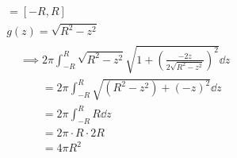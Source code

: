 \begin{bsp*}[note = Oberfläche einer Kugel mit Radius $R$]
	\begin{gather*}
		[a,b] = [-R,R] \\
		g(z) = \sqrt{R^2 - z^2} \\
		\begin{split}
			&\implies 2\pi \int_{-R}^R \sqrt{R^2 - z^2} \sqrt{1 + \left( \frac{-2z}{2\sqrt{R^2 -z^2}} \right)^2} \dd z \\
			&\qquad= 2\pi \int_{-R}^R \sqrt{(R^2 - z^2) + (-z)^2} \dd z \\
			&\qquad= 2\pi \int_{-R}^R R \dd z \\
			&\qquad= 2\pi \cdot R \cdot 2R \\
			&\qquad= 4\pi R^2
		\end{split}
	\end{gather*}
\end{bsp*}
